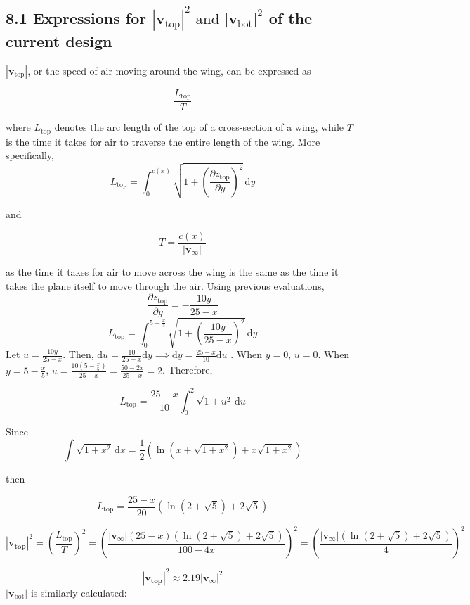 \documentclass[12pt]{article}
\begin{document}
\subsection*{8.1 Expressions for \(|\mathbf{v}_{\text{top}}|^2 \text{ and } |\mathbf{v}_{\text{bot}}|^2 \) of the current design}

$|\mathbf{v}_{\text{top}}|$, or the speed of air moving around the wing, can be expressed as 

\[\frac{L_{\text{top}}}{T}\]

where $L_{\text{top}}$ denotes the arc length of the top of a cross-section of a wing, while $T$ is the time it takes for air to traverse the entire length of the wing. More specifically, 
\[L_{\text{top}} =  \int_0^{c(x)} \sqrt{1 +  \left(\frac{\partial z_\text{top}}{\partial y}\right)^2}   \, \mathrm{d}y   \]

and 

\[T = \frac{c(x)}{|\mathbf{v}_{\infty}|}\] 

as the time it takes for air to move across the wing is the same as the time it takes the plane itself to move through the air. Using previous evaluations, 
\\
\[ \frac{\partial z_{\text{top}}}{\partial y} = -\frac{10y}{25 - x} \]
\[L_{\text{top}} =  \int_{0}^{5 - \frac{x}{5}} \sqrt{1 + \left( \frac{10y}{25 - x} \right)^2} \, \mathrm{d}y \]
Let $u = \frac{10y}{25 - x}$. Then, $\mathrm{d}u = \frac{10}{25 - x} \mathrm{d}y \implies \mathrm{d}y = \frac{25 - x}{10} \mathrm{d}u$ . When $y = 0$, $u = 0$. When $y = 5 - \frac{x}{5}$, $u = \frac{10(5 - \frac{x}{5})}{25 - x} = \frac{50-2x}{25-x} = 2$.
Therefore, 

\[L_{\text{top}} = \frac{25 - x}{10} \int_0^2 \sqrt{1 + u^2} \, \mathrm{d}u \]

Since \[\int \sqrt{1 + x^2} \, \mathrm{d}x = \frac{1}{2} (\ln(x + \sqrt{1 + x^2}) + x\sqrt{1 + x^2})\]

then

\[L_{\text{top}} = \frac{25 - x}{20}\left( \ln(2 + \sqrt{5}) + 2\sqrt{5}\right) \]

\[ |\mathbf{v_{\text{top}}}|^2 = \left(\frac{L_\text{top}}{T}\right)^2 = \left( \frac{|\mathbf{v}_{\infty}|(25 - x)( \ln(2 + \sqrt{5}) + 2\sqrt{5}) }{100 - 4x}\right)^2 =  \left( \frac{|\mathbf{v}_{\infty}|( \ln(2 + \sqrt{5}) + 2\sqrt{5}) }{4}\right)^2 \]

\[|\mathbf{v_{\text{top}}}|^2 \approx 2.19 |\mathbf{v}_{\infty}|^2  \]
$|\mathbf{v}_{\text{bot}}|$ is similarly calculated:
\end{document}
